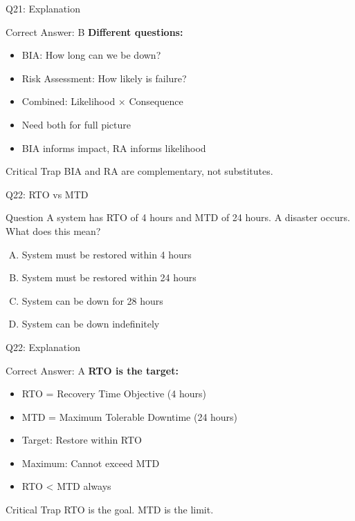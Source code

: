 \documentclass{beamer}
\begin{document}
			\begin{frame}{Q21: Explanation}
				\begin{block}{Correct Answer: B}
					\textbf{Different questions:}
					\begin{itemize}
						\item BIA: How long can we be down?
						\item Risk Assessment: How likely is failure?
						\item Combined: Likelihood × Consequence
						\item Need both for full picture
						\item BIA informs impact, RA informs likelihood
					\end{itemize}
				\end{block}
				\begin{alertblock}{Critical Trap}
					BIA and RA are complementary, not substitutes.
				\end{alertblock}
			\end{frame}
			
			\begin{frame}{Q22: RTO vs MTD}
				\begin{block}{Question}
					A system has RTO of 4 hours and MTD of 24 hours. A disaster occurs. What does this mean?
				\end{block}
				\begin{enumerate}[(A)]
					\item System must be restored within 4 hours
					\item System must be restored within 24 hours
					\item System can be down for 28 hours
					\item System can be down indefinitely
				\end{enumerate}
			\end{frame}
			
			\begin{frame}{Q22: Explanation}
				\begin{block}{Correct Answer: A}
					\textbf{RTO is the target:}
					\begin{itemize}
						\item RTO = Recovery Time Objective (4 hours)
						\item MTD = Maximum Tolerable Downtime (24 hours)
						\item Target: Restore within RTO
						\item Maximum: Cannot exceed MTD
						\item RTO < MTD always
					\end{itemize}
				\end{block}
				\begin{alertblock}{Critical Trap}
					RTO is the goal. MTD is the limit.
				\end{alertblock}
			\end{frame}
			
\end{document}
